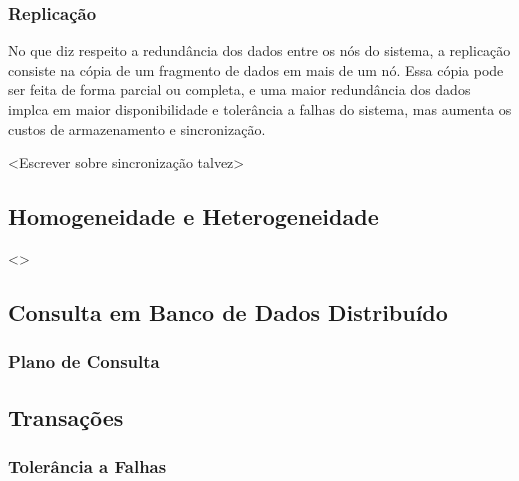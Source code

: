 \subsubsection{Replicação}
No que diz respeito a redundância dos dados entre os nós do sistema,
a replicação consiste na cópia de um fragmento de dados em mais de um nó. 
Essa cópia pode ser feita de forma parcial ou completa, e uma maior redundância dos dados 
implca em maior disponibilidade e tolerância a falhas do sistema, mas aumenta os custos de armazenamento e sincronização.

<Escrever sobre sincronização talvez>

\subsection{Homogeneidade e Heterogeneidade}
<>

\subsection{Consulta em Banco de Dados Distribuído}
\subsubsection{Plano de Consulta}


\subsection{Transações}
\subsubsection{Tolerância a Falhas}

